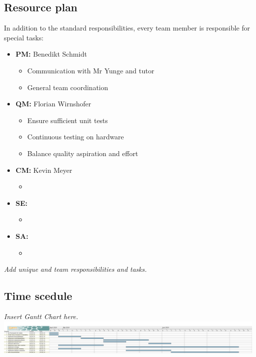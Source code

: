 \documentclass[12pt]{article}
\begin{document}
\subsection{Resource plan}
In addition to the standard responsibilities, every team member is responsible for special tasks:
\begin{itemize}
	\item \textbf{PM:} Benedikt Schmidt
	\begin{itemize}
		\item Communication with Mr Yunge and tutor
		\item General team coordination
	\end{itemize}
	 
	\item \textbf{QM:} Florian Wirnshofer
	\begin{itemize}
		\item Ensure sufficient unit tests
		\item Continuous testing on hardware
		\item Balance quality aspiration and effort
	\end{itemize}
	
	\item \textbf{CM:} Kevin Meyer
	\begin{itemize}
		\item
	\end{itemize}
	
	\item \textbf{SE:} 
	\begin{itemize}
		\item
	\end{itemize}
	
	\item \textbf{SA:} 
	\begin{itemize}
		\item
	\end{itemize}
	
\end{itemize}
\textit{Add unique and team responsibilities and tasks.}

\subsection{Time scedule}
\textit{Insert Gantt Chart here.}\\
\includegraphics[width=\textwidth]{../ganttchart.png}
\end{document}

